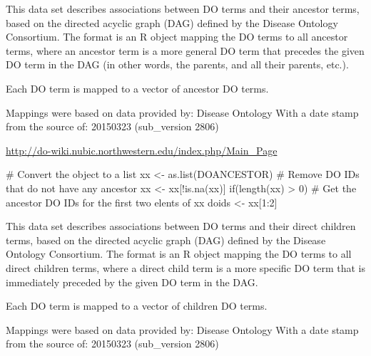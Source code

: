 \documentclass[a4paper]{book}
\begin{document}
%
\begin{Description}\relax
This data set describes associations between DO 
terms and their ancestor  terms, based on the directed acyclic
graph (DAG) defined by the Disease Ontology Consortium. The format is an R
object mapping the DO  terms to all ancestor terms, where an
ancestor term is a more general DO term that precedes
the given DO term in the DAG (in other words, the parents, and all
their parents, etc.).
\end{Description}
%
\begin{Details}\relax
Each DO  term is mapped to a vector of ancestor DO  terms.



Mappings were based on data provided by: Disease Ontology
With a date stamp from the source of: 20150323 (sub\_version 2806)


\end{Details}
%
\begin{References}\relax
\url{http://do-wiki.nubic.northwestern.edu/index.php/Main_Page} 

\end{References}
%
\begin{Examples}
\begin{ExampleCode}
  # Convert the object to a list
  xx <- as.list(DOANCESTOR)
  # Remove DO IDs that do not have any ancestor
  xx <- xx[!is.na(xx)]
  if(length(xx) > 0){
    # Get the ancestor DO IDs for the first two elents of xx
    doids <- xx[1:2]
  }
  
\end{ExampleCode}
\end{Examples}
%
\begin{Description}\relax
This data set describes associations between DO 
terms and their direct children  terms, based on the directed acyclic
graph (DAG) defined by the Disease Ontology Consortium. The format is an R
object mapping the DO  terms to all direct children terms, where a
direct child term is a more specific DO term that is immediately preceded
by the given DO term in the DAG.
\end{Description}
%
\begin{Details}\relax
Each DO  term is mapped to a vector of children DO  terms.


Mappings were based on data provided by: Disease Ontology
With a date stamp from the source of: 20150323 (sub\_version 2806)


\end{Details}
\end{document}
